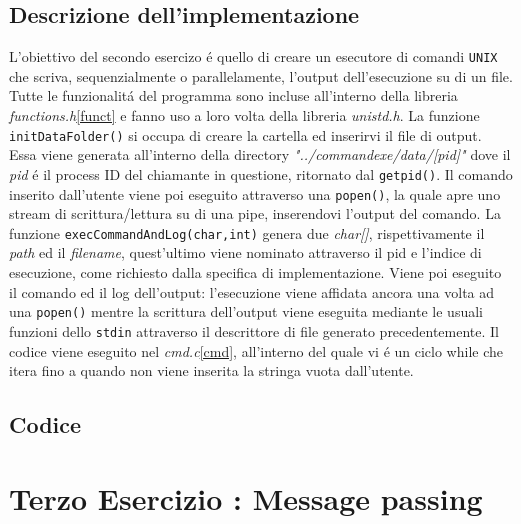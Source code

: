 \documentclass[a4paper]{article}
\begin{document}
\subsection{Descrizione dell'implementazione}
L'obiettivo del secondo esercizo \'e quello di creare un esecutore di comandi \texttt{UNIX} che scriva, sequenzialmente o parallelamente, l'output dell'esecuzione su di un file. \\
Tutte le funzionalit\'a del programma sono incluse all'interno della libreria \textit{functions.h}\ref{funct} e fanno uso a loro volta della libreria \textit{unistd.h}.
La funzione \texttt{initDataFolder()} si occupa di creare la cartella ed inserirvi il file di output. Essa viene generata all'interno della directory \textit{"../commandexe/data/[pid]"} dove il \textit{pid} \'e il process ID del chiamante in questione, ritornato dal \texttt{getpid()}.
Il comando inserito dall'utente viene poi eseguito attraverso una \texttt{popen()}, la quale apre uno stream di scrittura/lettura su di una pipe, inserendovi l'output del comando.
La funzione \texttt{execCommandAndLog(char,int)} genera due \textit{char[]}, rispettivamente il \textit{path} ed il \textit{filename}, quest'ultimo viene nominato attraverso il pid e l'indice di esecuzione, come richiesto dalla specifica di implementazione.
Viene poi eseguito il comando ed il log dell'output: l'esecuzione viene affidata ancora una volta ad una \texttt{popen()} mentre la scrittura dell'output viene eseguita mediante le usuali funzioni dello \texttt{stdin} attraverso il descrittore di file generato precedentemente.
Il codice viene eseguito nel \textit{cmd.c}\ref{cmd}, all'interno del quale vi \'e un ciclo while che itera fino a quando non viene inserita la stringa vuota dall'utente.

\subsection{Codice}



\newpage
\section{Terzo Esercizio : Message passing}
\end{document}
